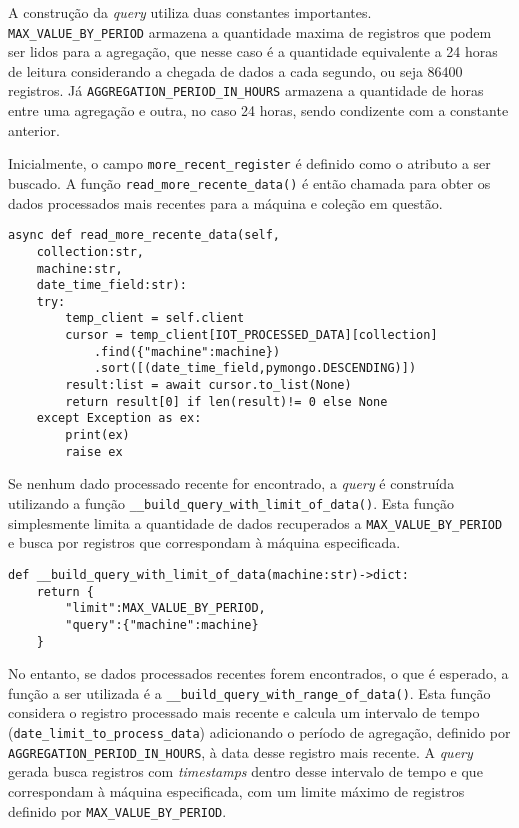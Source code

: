 A construção da \textit{query} utiliza duas constantes importantes. \texttt{MAX\_VALUE\_BY\_PERIOD} armazena a quantidade maxima de registros que podem ser lidos para a agregação, que nesse caso é a quantidade equivalente a 24 horas de leitura considerando a chegada de dados a cada segundo, ou  seja 86400 registros. Já \texttt{AGGREGATION\_PERIOD\_IN\_HOURS} armazena a quantidade de horas entre uma agregação e outra, no caso 24 horas, sendo condizente com a constante anterior. 

Inicialmente, o campo \texttt{more\_recent\_register} é definido como o atributo a ser buscado. A função \texttt{read\_more\_recente\_data()} é então chamada para obter os dados processados mais recentes para a máquina e coleção em questão.

\begin{verbatim}
async def read_more_recente_data(self,
    collection:str,
    machine:str,
    date_time_field:str):
    try:
        temp_client = self.client
        cursor = temp_client[IOT_PROCESSED_DATA][collection]
            .find({"machine":machine})
            .sort([(date_time_field,pymongo.DESCENDING)])
        result:list = await cursor.to_list(None)
        return result[0] if len(result)!= 0 else None
    except Exception as ex:
        print(ex)
        raise ex
\end{verbatim}

Se nenhum dado processado recente for encontrado, a \textit{query} é construída utilizando a função \texttt{\_\_build\_query\_with\_limit\_of\_data()}. Esta função simplesmente limita a quantidade de dados recuperados a \texttt{MAX\_VALUE\_BY\_PERIOD} e busca por registros que correspondam à máquina especificada.

\begin{verbatim}
def __build_query_with_limit_of_data(machine:str)->dict:
    return {
        "limit":MAX_VALUE_BY_PERIOD,
        "query":{"machine":machine}
    }
\end{verbatim}


No entanto, se dados processados recentes forem encontrados, o que é esperado, a função a ser utilizada é a \texttt{\_\_build\_query\_with\_range\_of\_data()}. Esta função considera o registro processado mais recente e calcula um intervalo de tempo (\texttt{date\_limit\_to\_process\_data}) adicionando o período de agregação, definido por \texttt{AGGREGATION\_PERIOD\_IN\_HOURS}, à data desse registro mais recente. A \textit{query} gerada busca registros com \textit{timestamps} dentro desse intervalo de tempo e que correspondam à máquina especificada, com um limite máximo de 
registros definido por \texttt{MAX\_VALUE\_BY\_PERIOD}.

